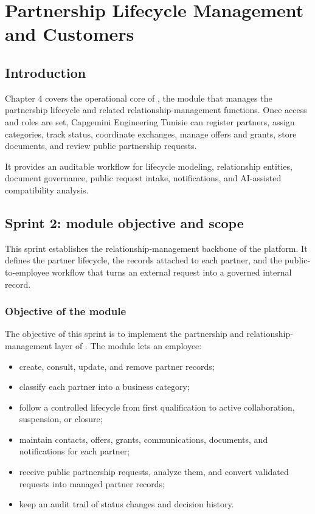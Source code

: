 \chapter{Partnership Lifecycle Management and Customers}

\section*{Introduction}
Chapter 4 covers the operational core of \projectname{}, the module that manages the partnership lifecycle and related relationship-management functions. Once access and roles are set, Capgemini Engineering Tunisie can register partners, assign categories, track status, coordinate exchanges, manage offers and grants, store documents, and review public partnership requests.

It provides an auditable workflow for lifecycle modeling, relationship entities, document governance, public request intake, notifications, and AI-assisted compatibility analysis.

\section{Sprint 2: module objective and scope}
This sprint establishes the relationship-management backbone of the platform. It defines the partner lifecycle, the records attached to each partner, and the public-to-employee workflow that turns an external request into a governed internal record.

\subsection{Objective of the module}
The objective of this sprint is to implement the partnership and relationship-management layer of \projectname{}. The module lets an employee:
\begin{itemize}
  \item create, consult, update, and remove partner records;
  \item classify each partner into a business category;
  \item follow a controlled lifecycle from first qualification to active collaboration, suspension, or closure;
  \item maintain contacts, offers, grants, communications, documents, and notifications for each partner;
  \item receive public partnership requests, analyze them, and convert validated requests into managed partner records;
  \item keep an audit trail of status changes and decision history.
\end{itemize}

